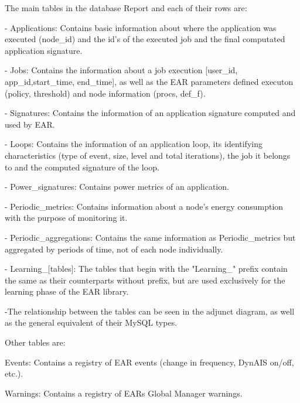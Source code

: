 The main tables in the database Report and each of their rows are\+: \begin{DoxyVerb}- Applications:  Contains basic information about where the application was executed (node_id) and the id's of the executed job and the final computated application signature.

- Jobs:  Contains the information about a job execution [user_id, app_id,start_time, end_time], as well as the EAR parameters defined executon (policy, threshold) and node information (procs, def_f). 

- Signatures: Contains the information of an application signature computed and used by EAR.

- Loops: Contains the information of an application loop, its identifying characteristics (type of event, size, level and total iterations), the job it belongs to and the computed signature of
the loop.

- Power_signatures: Contains power metrics of an application.

- Periodic_metrics: Contains information about a node's energy consumption with the purpose of monitoring it.

- Periodic_aggregations: Contains the same information as Periodic_metrics but aggregated by periods of time, not of each node individually.

- Learning_[tables]: The tables that begin with the "Learning_" prefix contain the same as their counterparts without prefix, but are used exclusively for the learning phase of the EAR library.
\end{DoxyVerb}


-\/\+The relationship between the tables can be seen in the adjunct diagram, as well as the general equivalent of their My\+S\+QL types.

Other tables are\+:
\begin{DoxyItemize}
\item Events\+: Contains a registry of E\+AR events (change in frequency, Dyn\+A\+IS on/off, etc.).
\item Warnings\+: Contains a registry of E\+AR\textquotesingle{}s Global Manager warnings. 
\end{DoxyItemize}
